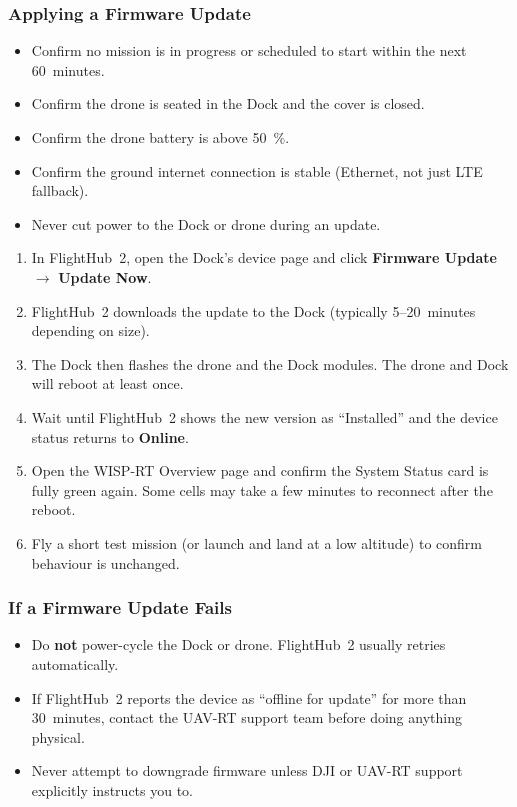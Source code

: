 \documentclass[11pt,letterpaper]{article}
\begin{document}
\subsubsection{Applying a Firmware Update}

\begin{warnbox}
\begin{itemize}[leftmargin=1.3em]
  \item Confirm no mission is in progress or scheduled to start within the next 60~minutes.
  \item Confirm the drone is seated in the Dock and the cover is closed.
  \item Confirm the drone battery is above 50~\%.
  \item Confirm the ground internet connection is stable (Ethernet, not just LTE fallback).
  \item Never cut power to the Dock or drone during an update.
\end{itemize}
\end{warnbox}

\begin{enumerate}[leftmargin=1.5em]
  \item In FlightHub~2, open the Dock's device page and click \textbf{Firmware Update} $\rightarrow$ \textbf{Update Now}.
  \item FlightHub~2 downloads the update to the Dock (typically 5--20~minutes depending on size).
  \item The Dock then flashes the drone and the Dock modules. The drone and Dock will reboot at least once.
  \item Wait until FlightHub~2 shows the new version as ``Installed'' and the device status returns to \textbf{Online}.
  \item Open the WISP-RT Overview page and confirm the System Status card is fully green again. Some cells may take a few minutes to reconnect after the reboot.
  \item Fly a short test mission (or launch and land at a low altitude) to confirm behaviour is unchanged.
\end{enumerate}

\subsubsection{If a Firmware Update Fails}

\begin{itemize}[leftmargin=1.5em]
  \item Do \textbf{not} power-cycle the Dock or drone. FlightHub~2 usually retries automatically.
  \item If FlightHub~2 reports the device as ``offline for update'' for more than 30~minutes, contact the UAV-RT support team before doing anything physical.
  \item Never attempt to downgrade firmware unless DJI or UAV-RT support explicitly instructs you to.
\end{itemize}
\end{document}
